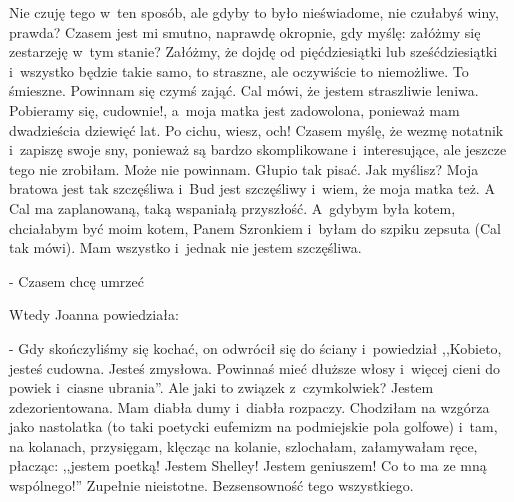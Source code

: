 \documentclass[oneside,polish,12pt,sfheadings]{mwbk}
\begin{document}
Nie czuję tego w~ten sposób, ale gdyby to było nieświadome, nie czułabyś
winy, prawda? Czasem jest mi smutno, naprawdę okropnie, gdy myślę:
załóżmy się zestarzeję w~tym stanie? Załóżmy, że dojdę od pięćdziesiątki
lub sześćdziesiątki i~wszystko będzie takie samo, to straszne, ale
oczywiście to niemożliwe. To śmieszne. Powinnam się czymś zająć. Cal
mówi, że jestem straszliwie leniwa. Pobieramy się, cudownie!, a~moja
matka jest zadowolona, ponieważ mam dwadzieścia dziewięć lat. Po cichu,
wiesz, och! Czasem myślę, że wezmę notatnik i~zapiszę swoje sny, ponieważ
są bardzo skomplikowane i~interesujące, ale jeszcze tego nie zrobiłam.
Może nie powinnam. Głupio tak pisać. Jak myślisz? Moja bratowa jest
tak szczęśliwa i~Bud jest szczęśliwy i~wiem, że moja matka też. A
Cal ma zaplanowaną, taką wspaniałą przyszłość. A~gdybym była kotem,
chciałabym być moim kotem, Panem Szronkiem i~byłam do szpiku zepsuta
(Cal tak mówi). Mam wszystko i~jednak nie jestem szczęśliwa.

- Czasem chcę umrzeć

Wtedy Joanna powiedziała: 

- Gdy skończyliśmy się kochać, on odwrócił
się do ściany i~powiedział ,,Kobieto, jesteś cudowna. Jesteś zmysłowa.
Powinnaś mieć dłuższe włosy i~więcej cieni do powiek i~ciasne ubrania''.
Ale jaki to związek z~czymkolwiek? Jestem zdezorientowana. Mam diabła
dumy i~diabła rozpaczy. Chodziłam na wzgórza jako nastolatka (to taki
poetycki eufemizm na podmiejskie pola golfowe) i~tam, na kolanach,
przysięgam, klęcząc na kolanie, szlochałam, załamywałam ręce, płacząc:
,,jestem poetką! Jestem Shelley! Jestem geniuszem! Co to ma ze mną wspólnego!''
Zupełnie nieistotne. Bezsensowność tego wszystkiego.
\end{document}
